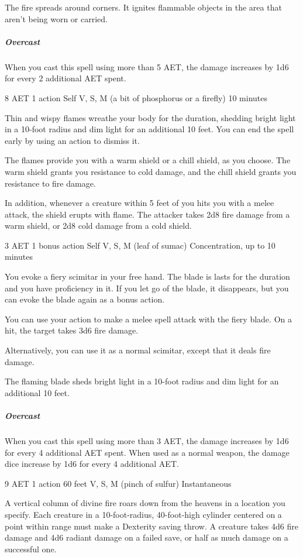 The fire spreads around corners. It ignites flammable objects in the area that aren't being worn or carried.

\subparagraph*{Overcast} When you cast this spell using more than 5 AET, the damage increases by 1d6 for every 2 additional AET spent.


{8 AET}
{1 action}
{Self}
{V, S, M (a bit of phosphorus or a firefly)}
{10 minutes}

Thin and wispy flames wreathe your body for the duration, shedding bright light in a 10-foot radius and dim light for an additional 10 feet. You can end the spell early by using an action to dismiss it.

The flames provide you with a warm shield or a chill shield, as you choose. The warm shield grants you resistance to cold damage, and the chill shield grants you resistance to fire damage.

In addition, whenever a creature within 5 feet of you hits you with a melee attack, the shield erupts with flame. The attacker takes 2d8 fire damage from a warm shield, or 2d8 cold damage from a cold shield.


{3 AET}
{1 bonus action}
{Self}
{V, S, M (leaf of sumac)}
{Concentration, up to 10 minutes}

You evoke a fiery scimitar in your free hand. The blade is lasts for the duration and you have proficiency in it. If you let go of the blade, it disappears, but you can evoke the blade again as a bonus action.

You can use your action to make a melee spell attack with the fiery blade. On a hit, the target takes 3d6 fire damage.

Alternatively, you can use it as a normal scimitar, except that it deals fire damage.

The flaming blade sheds bright light in a 10-foot radius and dim light for an additional 10 feet.

\subparagraph*{Overcast} When you cast this spell using more than 3 AET, the damage increases by 1d6 for every 4 additional AET spent. When used as a normal weapon, the damage dice increase by 1d6 for every 4 additional AET.


{9 AET}
{1 action}
{60 feet}
{V, S, M (pinch of sulfur)}
{Instantaneous}

A vertical column of divine fire roars down from the heavens in a location you specify. Each creature in a 10-foot-radius, 40-foot-high cylinder centered on a point within range must make a Dexterity saving throw. A creature takes 4d6 fire damage and 4d6 radiant damage on a failed save, or half as much damage on a successful one.

